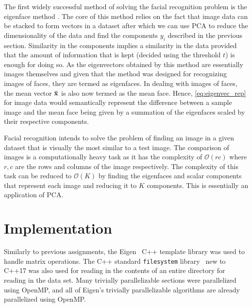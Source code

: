 \documentclass[headings=optiontoheadandtoc,listof=totoc,parskip=full]{scrartcl}
\begin{document}
The first widely successful method of solving the facial recognition problem is the eigenface method \cite{eigenfaces}. The core of this method relies on the fact that image data can be stacked to form vectors in a dataset after which we can use PCA to reduce the dimensionality of the data and find the components $y_i$ described in the previous section. Similarity in the components implies a similarity in the data provided that the amount of information that is kept (decided using the threshold $t$) is enough for doing so. As the eigenvectors obtained by this method are essentially images themselves and given that the method was designed for recognizing images of faces, they are termed as eigenfaces. In dealing with images of faces, the mean vector $\mathbf{\Bar{x}}$ is also now termed as the mean face. Hence, \cref{eq:eigenvec_rep} for image data would semantically represent the difference between a sample image and the mean face being given by a summation of the eigenfaces scaled by their respective components. 

Facial recognition intends to solve the problem of finding an image in a given dataset that is visually the most similar to a test image. The comparison of images is a computationally heavy task as it has the complexity of $\mathcal O(rc)$ where $r, c$ are the rows and columns of the image respectively. The complexity of this task can be reduced to $\mathcal O(K)$ by finding the eigenfaces and scalar components that represent each image and reducing it to $K$ components. This is essentially an application of PCA.

\section{Implementation}
\label{sec:impl}
Similarly to previous assignments, the Eigen~\autocite{eigen} C++ template library was used to handle matrix operations. The C++ standard \texttt{filesystem} library~\autocite{filesystem} new to C++17 was also used for reading in the contents of an entire directory for reading in the data set. Many trivially parallelizable sections were parallelized using OpenMP, and all of Eigen's trivially parallelizable algorithms are already parallelized using OpenMP.
\end{document}
